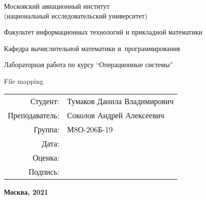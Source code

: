 \begin{titlepage}
\begin{center}
\bfseries

{\Large Московский авиационный институт\\ (национальный исследовательский университет)}

\vspace{48pt}

{\large Факультет информационных технологий и прикладной математики
}

{\large Кафедра вычислительной математики и~программирования}


\vspace{48pt}

Лабораторная работа  по курсу \enquote{Операционные системы}

\vspace{24pt}

{\Large File mapping}

\end{center}

\vspace{72pt}

\begin{flushright}
\begin{tabular}{rl}
Студент: & Тумаков Данила Владимирович \\
Преподаватель: & Соколов Андрей Алексеевич  \\
Группа: & М8О-206Б-19 \\
Дата: & \\
Оценка: & \\
Подпись: & \\
\end{tabular}
\end{flushright}

\vfill

\begin{center}
\bfseries
Москва, 2021
\end{center}
\end{titlepage}

\pagebreak

